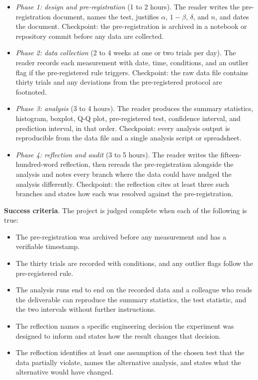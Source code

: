 \begin{project}
\begin{itemize}[leftmargin=*]
  \item \textit{Phase 1: design and pre-registration} (1 to 2
    hours). The reader writes the pre-registration document, names
    the test, justifies $\alpha$, $1 - \beta$, $\delta$, and $n$,
    and dates the document. Checkpoint: the pre-registration is
    archived in a notebook or repository commit before any data
    are collected.
  \item \textit{Phase 2: data collection} (2 to 4 weeks at one or
    two trials per day). The reader records each measurement with
    date, time, conditions, and an outlier flag if the
    pre-registered rule triggers. Checkpoint: the raw data file
    contains thirty trials and any deviations from the
    pre-registered protocol are footnoted.
  \item \textit{Phase 3: analysis} (3 to 4 hours). The reader
    produces the summary statistics, histogram, boxplot, Q-Q plot,
    pre-registered test, confidence interval, and prediction
    interval, in that order. Checkpoint: every analysis output is
    reproducible from the data file and a single analysis script
    or spreadsheet.
  \item \textit{Phase 4: reflection and audit} (3 to 5 hours). The
    reader writes the fifteen-hundred-word reflection, then
    rereads the pre-registration alongside the analysis and notes
    every branch where the data could have nudged the analysis
    differently. Checkpoint: the reflection cites at least three
    such branches and states how each was resolved against the
    pre-registration.
\end{itemize}

\textbf{Success criteria}. The project is judged complete when
each of the following is true:

\begin{itemize}[leftmargin=*]
  \item The pre-registration was archived before any measurement
    and has a verifiable timestamp.
  \item The thirty trials are recorded with conditions, and any
    outlier flags follow the pre-registered rule.
  \item The analysis runs end to end on the recorded data and a
    colleague who reads the deliverable can reproduce the
    summary statistics, the test statistic, and the two intervals
    without further instructions.
  \item The reflection names a specific engineering decision the
    experiment was designed to inform and states how the result
    changes that decision.
  \item The reflection identifies at least one assumption of the
    chosen test that the data partially violate, names the
    alternative analysis, and states what the alternative would
    have changed.
\end{itemize}


\end{project}
